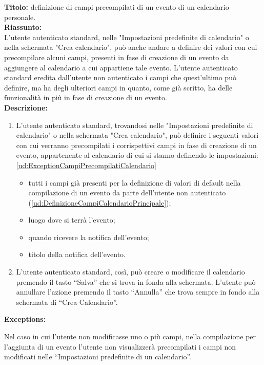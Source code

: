 \begin{listaPersonale}[UC]{}
\begin{listaPersonale2}[UC] {}
        \textbf{Titolo: } definizione di campi precompilati di un evento di un calendario personale. \\
        \textbf{Riassunto: } \\ L'utente autenticato standard, nelle "Impostazioni predefinite di calendario" o nella schermata "Crea calendario", può anche andare a definire dei valori con cui precompilare alcuni campi, presenti in fase di creazione di un evento da aggiungere al calendario a cui appartiene tale evento. L'utente autenticato standard eredita dall'utente non autenticato i campi che quest'ultimo può definire, ma ha degli ulteriori campi in quanto, come già scritto, ha delle funzionalità in più in fase di creazione di un evento. \\
        \textbf{Descrizione: } \\
        \begin {enumerate}
            \item L'utente autenticato standard, trovandosi nelle "Impostazioni predefinite di calendario" o nella schermata "Crea calendario", può definire i seguenti valori con cui verranno precompilati i corrispettivi campi in fase di creazione di un evento, appartenente al calendario di cui si stanno definendo le impostazioni: \ref{ud:ExceptionCampiPrecompilatiCalendario}
            \begin{itemize}
                \item tutti i campi già presenti per la definizione di valori di default nella compilazione di un evento da parte dell'utente non autenticato (\ref{ud:DefinizioneCampiCalendarioPrincipale});
                \item luogo dove si terrà l'evento;
                \item quando ricevere la notifica dell'evento;
                \item titolo della notifica dell'evento.
            \end{itemize}
            \item L'utente autenticato standard, così, può creare o modificare il calendario premendo il tasto “Salva” che si trova in fonda alla schermata. L'utente può annullare l'azione premendo il tasto “Annulla” che trova sempre in fondo alla schermata di “Crea Calendario”.
        \end{enumerate}
        \textbf{Exceptions:}
        \begin{enumerate}[label=\textbf{[exception \arabic{enumiii}]}, ref= \textbf{[exception \arabic{enumiii}]}]
             Nel caso in cui l'utente non modificasse uno o più campi, nella compilazione per l'aggiunta di un evento l'utente non visualizzerà precompilati i campi non modificati nelle “Impostazioni predefinite di un calendario”.
        \end{enumerate}
        


\end{listaPersonale2}
\end{listaPersonale}
